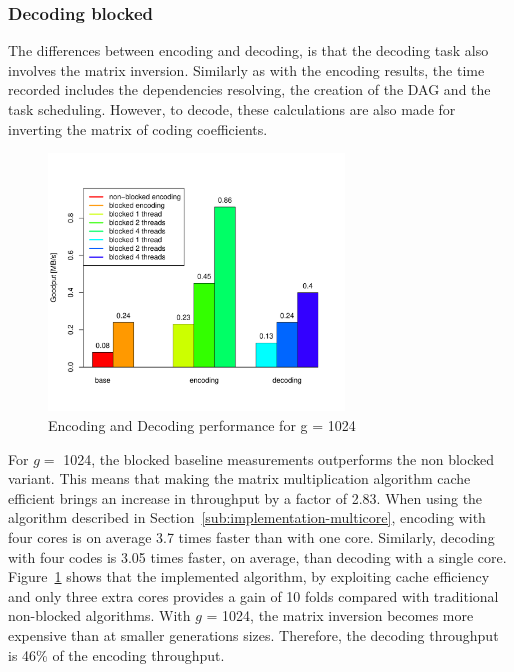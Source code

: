 \subsubsection{Decoding blocked}
The differences between encoding and decoding, is that the decoding task
also involves the matrix inversion. Similarly as with the encoding results,
the time recorded includes the dependencies resolving, the creation of the
\ac{DAG} and the task scheduling. However, to decode, these calculations are also made for inverting the matrix of coding coefficients.

\begin{figure}[ht!]
\centering
\includegraphics[width=0.7\textwidth]{images/2015-04-18_encoding_decoding_1024.pdf}
\caption{Encoding and Decoding performance for g = 1024 \cite{wunderlich2015network}}
\label{enc_dec1024}
\end{figure}

For $g=$ 1024, the blocked baseline measurements outperforms the non blocked
variant. This means that making the matrix multiplication algorithm cache
efficient brings an increase in throughput by a factor of 2.83. When using the
algorithm described in Section~\ref{sub:implementation-multicore},
encoding with four cores is on average 3.7 times faster than with one core.
Similarly, decoding with four codes is 3.05 times faster, on average, than
decoding with a single core. Figure~\ref{enc_dec1024} shows that the
implemented algorithm, by exploiting cache efficiency and only three extra
cores provides a gain of 10 folds compared with traditional non-blocked
algorithms. With $g$ = 1024, the matrix inversion becomes more expensive
than at smaller generations sizes. Therefore, the decoding throughput
is 46\% of the encoding throughput.

